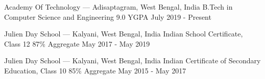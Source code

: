 

\begin{cventries}

  \cventry
    {Academy Of Technology --- Adisaptagram, West Bengal, India} %
    {B.Tech in Computer Science and Engineering} %
    {9.0 YGPA} %
    {July 2019 - Present} %
    {
      \begin{cvitems} %
      \end{cvitems}
    }

 \cventry
    {Julien Day School --- Kalyani, West Bengal, India} %
    {Indian School Certificate, Class 12} %
    {87\% Aggregate} %
    {May 2017 - May 2019} %
    {
      \begin{cvitems} %
      \end{cvitems}
    }

  \cventry
    {Julien Day School --- Kalyani, West Bengal, India} %
    {Indian Certificate of Secondary Education, Class 10} %
    {85\% Aggregate} %
    {May 2015 - May 2017} %
    {
      \begin{cvitems} %
      \end{cvitems}
    }

\end{cventries}
